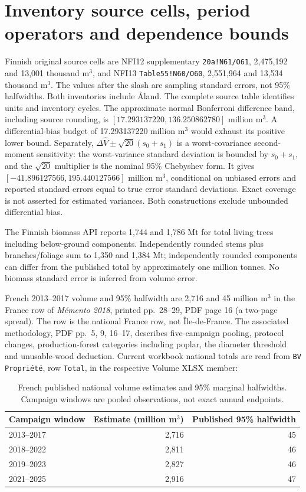 \section{Inventory source cells, period operators and dependence bounds}
Finnish original source cells are NFI12 supplementary \texttt{20a!N61/O61}, 2,475,192 and 13,001 thousand m$^3$, and NFI13 \texttt{Table55!N60/O60}, 2,551,964 and 13,534 thousand m$^3$. The values after the slash are sampling standard errors, not 95\% halfwidths. Both inventories include \AA land. The complete source table identifies units and inventory cycles. The approximate normal Bonferroni difference band, including source rounding, is $[17.293137220,136.250862780]$ million m$^3$. A differential-bias budget of 17.293137220 million m$^3$ would exhaust its positive lower bound. Separately, $\Delta\widehat V\pm\sqrt{20}(s_0+s_1)$ is a worst-covariance second-moment sensitivity: the worst-variance standard deviation is bounded by $s_0+s_1$, and the $\sqrt{20}$ multiplier is the nominal 95\% Chebyshev form. It gives $[-41.896127566,195.440127566]$ million m$^3$, conditional on unbiased errors and reported standard errors equal to true error standard deviations. Exact coverage is not asserted for estimated variances. Both constructions exclude unbounded differential bias.

The Finnish biomass API reports 1,744 and 1,786 Mt for total living trees including below-ground components. Independently rounded stems plus branches/foliage sum to 1,350 and 1,384 Mt; independently rounded components can differ from the published total by approximately one million tonnes. No biomass standard error is inferred from volume error. 

French 2013--2017 volume and 95\% halfwidth are 2,716 and 45 million m$^3$ in the France row of \emph{M\'emento 2018}, printed pp.~28--29, PDF page 16 (a two-page spread). The row is the national France row, not \^Ile-de-France. The associated methodology, PDF pp.~5, 9, 16--17, describes five-campaign pooling, protocol changes, production-forest categories including poplar, the diameter threshold and unusable-wood deduction. Current workbook national totals are read from \texttt{BV Propri\'et\'e}, row \texttt{Total}, in the respective Volume XLSX member:
\begin{table}[htbp]\centering\small
\caption{French published national volume estimates and 95\% marginal halfwidths. Campaign windows are pooled observations, not exact annual endpoints.}\label{tab:SI_France_windows}
\begin{tabular}{lrr}\toprule
Campaign window & Estimate (million m$^3$) & Published 95\% halfwidth\\\midrule
2013--2017 & 2,716 & 45\\
2018--2022 & 2,811 & 46\\
2019--2023 & 2,827 & 46\\
2021--2025 & 2,916 & 47\\\bottomrule
\end{tabular}\end{table}

